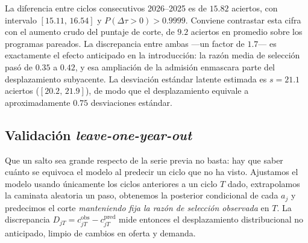 \documentclass[aps,prd,reprint,amsmath,amssymb,nofootinbib,superscriptaddress]{revtex4-2}
\begin{document}
La diferencia entre ciclos consecutivos 2026--2025 es de $15.82$
aciertos, con intervalo $[15.11,\,16.54]$ y
$P(\Delta\tau>0)>0.9999$. Conviene contrastar esta cifra con el aumento
crudo del puntaje de corte, de $9.2$ aciertos en promedio sobre los
programas pareados. La discrepancia entre ambas ---un factor de $1.7$---
es exactamente el efecto anticipado en la introducci\'on: la raz\'on media
de selecci\'on pas\'o de $0.35$ a $0.42$, y esa ampliaci\'on de la
admisi\'on enmascara parte del desplazamiento subyacente. La desviaci\'on
est\'andar latente estimada es $s=21.1$ aciertos
($[20.2,\,21.9]$), de modo que el desplazamiento equivale a
aproximadamente $0.75$ desviaciones est\'andar.

\subsection{Validaci\'on \emph{leave-one-year-out}}

Que un salto sea grande respecto de la serie previa no basta: hay que
saber cu\'anto se equivoca el modelo al predecir un ciclo que no ha visto.
Ajustamos el modelo usando \'unicamente los ciclos anteriores a un ciclo
$T$ dado, extrapolamos la caminata aleatoria un paso, obtenemos la
posterior condicional de cada $a_j$ y predecimos el corte
\emph{manteniendo fija la raz\'on de selecci\'on observada} en $T$. La
discrepancia $D_{jT}=c^{\mathrm{obs}}_{jT}-c^{\mathrm{pred}}_{jT}$ mide
entonces el desplazamiento distribucional no anticipado, limpio de
cambios en oferta y demanda.
\end{document}
